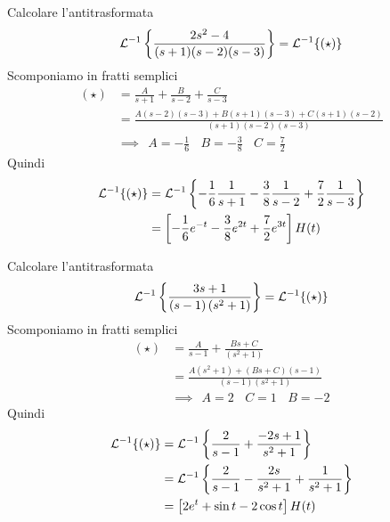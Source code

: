 Calcolare l'antitrasformata
\begin{equation*}
\mathcal{L}^{- 1}\left\{\frac{2s^{2} - 4}{(s + 1)(s - 2)(s - 3)}\right\} = \mathcal{L}^{- 1}\{(\star)\}
\end{equation*}
Scomponiamo in fratti semplici
\begin{equation*}
\begin{aligned}
(\star) & = \frac{A}{s + 1} + \frac{B}{s - 2} + \frac{C}{s - 3}\\
 & = \frac{A(s - 2)(s - 3) + B(s + 1)(s - 3) + C(s + 1)(s - 2)}{(s + 1)(s - 2)(s - 3)}\\
 & \implies \ \ A = -\frac{1}{6} \ \ \ \ B = -\frac{3}{8} \ \ \ \ C = \frac{7}{2}
\end{aligned}
\end{equation*}
Quindi
\begin{equation*}
\begin{aligned}
\mathcal{L}^{- 1}\{(\star)\} & = \mathcal{L}^{- 1}\left\{- \frac{1}{6}\frac{1}{s + 1} - \frac{3}{8}\frac{1}{s - 2} + \frac{7}{2}\frac{1}{s - 3}\right\}\\
 & = \left[ - \frac{1}{6} e^{- t} - \frac{3}{8} e^{2t} + \frac{7}{2} e^{3t}\right] H(t)
\end{aligned}
\end{equation*}
\Esercizio{}

Calcolare l'antitrasformata
\begin{equation*}
\mathcal{L}^{- 1}\left\{\frac{3s + 1}{(s - 1)\left(s^{2} + 1\right)}\right\} = \mathcal{L}^{- 1}\{(\star)\}
\end{equation*}
Scomponiamo in fratti semplici
\begin{equation*}
\begin{aligned}
(\star) & = \frac{A}{s - 1} + \frac{Bs + C}{\left(s^{2} + 1\right)}\\
 & = \frac{A\left(s^{2} + 1\right) + (Bs + C)(s - 1)}{(s - 1)\left(s^{2} + 1\right)}\\
 & \implies \ \ A = 2\ \ \ \ C = 1\ \ \ \ B = -2
\end{aligned}
\end{equation*}
Quindi
\begin{equation*}
\begin{aligned}
\mathcal{L}^{- 1}\{(\star)\} & = \mathcal{L}^{- 1}\left\{\frac{2}{s - 1} + \frac{- 2s + 1}{s^{2} + 1}\right\}\\
 & = \mathcal{L}^{- 1}\left\{\frac{2}{s - 1} - \frac{2s}{s^{2} + 1} + \frac{1}{s^{2} + 1}\right\}\\
 & = \left[ 2e^{t} + \sin t - 2\cos t\right] H(t)
\end{aligned}
\end{equation*}
\Esercizio{}

